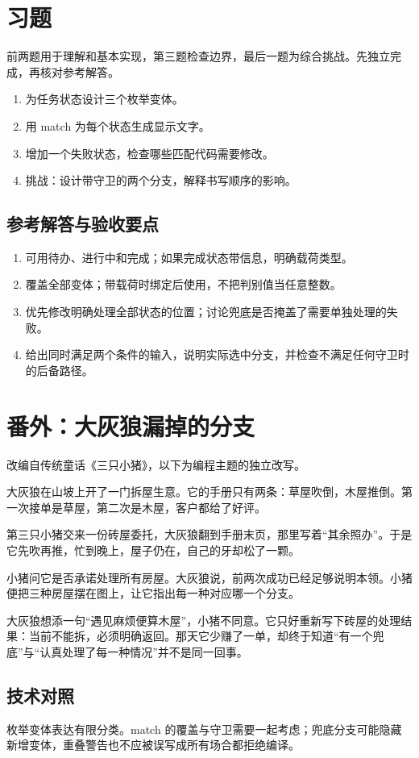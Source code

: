 \section{习题}

前两题用于理解和基本实现，第三题检查边界，最后一题为综合挑战。先独立完成，再核对参考解答。

\begin{enumerate}

\item 为任务状态设计三个枚举变体。

\item 用 match 为每个状态生成显示文字。

\item 增加一个失败状态，检查哪些匹配代码需要修改。

\item 挑战：设计带守卫的两个分支，解释书写顺序的影响。

\end{enumerate}

\subsection*{参考解答与验收要点}

\begin{enumerate}

\item 可用待办、进行中和完成；如果完成状态带信息，明确载荷类型。

\item 覆盖全部变体；带载荷时绑定后使用，不把判别值当任意整数。

\item 优先修改明确处理全部状态的位置；讨论兜底是否掩盖了需要单独处理的失败。

\item 给出同时满足两个条件的输入，说明实际选中分支，并检查不满足任何守卫时的后备路径。

\end{enumerate}

\section{番外：大灰狼漏掉的分支}

改编自传统童话《三只小猪》，以下为编程主题的独立改写。

大灰狼在山坡上开了一门拆屋生意。它的手册只有两条：草屋吹倒，木屋推倒。第一次接单是草屋，第二次是木屋，客户都给了好评。

第三只小猪交来一份砖屋委托，大灰狼翻到手册末页，那里写着“其余照办”。于是它先吹再推，忙到晚上，屋子仍在，自己的牙却松了一颗。

小猪问它是否承诺处理所有房屋。大灰狼说，前两次成功已经足够说明本领。小猪便把三种房屋摆在图上，让它指出每一种对应哪一个分支。

大灰狼想添一句“遇见麻烦便算木屋”，小猪不同意。它只好重新写下砖屋的处理结果：当前不能拆，必须明确返回。那天它少赚了一单，却终于知道“有一个兜底”与“认真处理了每一种情况”并不是同一回事。

\subsection*{技术对照}

枚举变体表达有限分类。match 的覆盖与守卫需要一起考虑；兜底分支可能隐藏新增变体，重叠警告也不应被误写成所有场合都拒绝编译。
